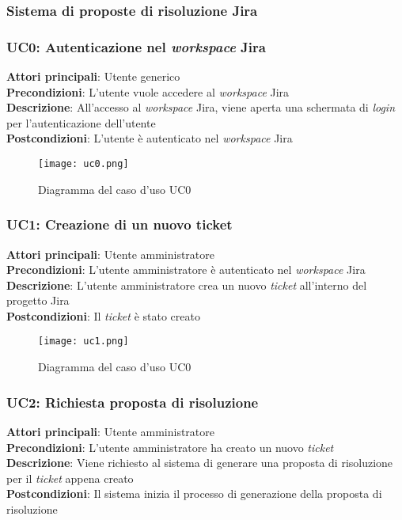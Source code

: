 \subsubsection{Sistema di proposte di risoluzione Jira}
\subsubsection{UC0: Autenticazione nel \textit{workspace} Jira} 
\textbf{Attori principali}: Utente generico \\
\textbf{Precondizioni}: L'utente vuole accedere al \textit{workspace} Jira \\
\textbf{Descrizione}: All'accesso al \textit{workspace} Jira, viene aperta una schermata di \textit{login} per l'autenticazione dell'utente \\
\textbf{Postcondizioni}: L'utente è autenticato nel \textit{workspace} Jira \\
\begin{figure}[H]
    \centering
    \texttt{[image: uc0.png]}
    \caption{Diagramma del caso d'uso UC0}
    \label{fig:UC0}
\end{figure}
\subsubsection{UC1: Creazione di un nuovo ticket}
\textbf{Attori principali}: Utente amministratore \\
\textbf{Precondizioni}: L'utente amministratore è autenticato nel \textit{workspace} Jira\\
\textbf{Descrizione}: L'utente amministratore crea un nuovo \textit{ticket} all'interno del progetto Jira \\
\textbf{Postcondizioni}: Il \textit{ticket} è stato creato \\
\begin{figure}[H]
    \centering
    \texttt{[image: uc1.png]}
    \caption{Diagramma del caso d'uso UC0}
    \label{fig:UC1}
\end{figure}
\subsubsection{UC2: Richiesta proposta di risoluzione}
\textbf{Attori principali}: Utente amministratore \\
\textbf{Precondizioni}: L'utente amministratore ha creato un nuovo \textit{ticket} \\
\textbf{Descrizione}: Viene richiesto al sistema di generare una proposta di risoluzione per il \textit{ticket} appena creato \\
\textbf{Postcondizioni}: Il sistema inizia il processo di generazione della proposta di risoluzione \\

